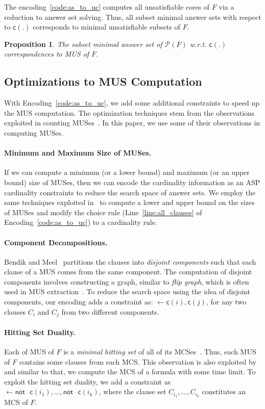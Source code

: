 \documentclass{article}
\newtheorem{proposition}{Proposition}
\newcommand{\cls}[1]{\ensuremath{\mathsf{c}(#1)}}
\newcommand{\program}[1]{\mathcal{P}(#1)}
\newcommand{\clarknot}{\ensuremath{\mathsf{not}}\text{ }}
\begin{document}
The encoding~\ref{code:as_to_uc} computes all unsatisfiable cores of $F$ via a reduction to answer set solving. Thus, all subset minimal answer sets 
with respect to $\cls{.}$ corresponds to minimal unsatisfiable subsets of $F$.
\begin{proposition}
The subset minimal answer set of $\program{F}$ w.r.t. $\cls{.}$ correspondences to MUS of $F$.
\end{proposition}

\subsection{Optimizations to MUS Computation}
With Encoding~\ref{code:as_to_uc}, we add some additional constraints to speed up the MUS computation. 
The optimization techniques stem from the observations exploited in counting MUSes~\cite{BM2021}.
In this paper, we use some of their observations in computing MUSes. 

\paragraph{Minimum and Maximum Size of MUSes.}
If we can compute a minimum (or a lower bound) and maximum (or an upper bound) size of MUSes, then we can encode the cardinality information as an ASP cardinality constraints to reduce the search space of answer sets. 
We employ the same techniques exploited in~\cite{BM2021} to compute a lower and upper bound on the sizes of MUSes and modify the choice rule (Line~\ref{line:all_clauses} of Encoding~\ref{code:as_to_uc}) to a cardinality rule. 

\paragraph{Component Decompositions.}
Bendik and Meel~\cite{BM2021} partitions the clauses into {\em disjoint components} such that each clause of a MUS comes from the same component. 
The computation of disjoint components involves constructing a graph, similar to {\em flip graph}, which is often used in MUS extraction~\cite{Wieringa2012}.
To reduce the search space using the idea of disjoint components, our encoding adds a constraint as: $\leftarrow \cls{i}, \cls{j}$, for any two clauses $C_i$ and $C_j$ from two different components.   

\paragraph{Hitting Set Duality.}
Each of MUS of $F$ is a {\em minimal hitting set} of all of its MCSes~\cite{DW1987,Reiter1987}.
Thus, each MUS of $F$ contains some clauses from each MCS. 
This observation is also exploited by~\cite{BM2021} and similar to that, we compute the MCS of a formula with some time limit. 
To exploit the hitting set duality, we add a constraint as $\leftarrow \clarknot \cls{i_1}, \ldots, \clarknot \cls{i_k}$, 
where the clause set $C_{i_1}, \ldots, C_{i_k}$ constitutes an MCS of $F$.
\end{document}
